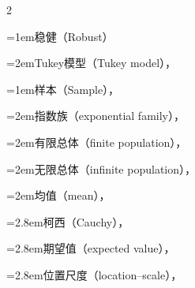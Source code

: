 \begin{multicols}{2}
\par\addvspace{2pt}
\par\noindent\hangindent=1em\hspace*{0em}\label{idx:915}稳健（Robust）\par
\par\noindent\hangindent=2em\hspace*{1em}\label{idx:916}Tukey模型（Tukey model），\hyperref[exercise:10.23]{\pageref*{exercise:10.23}}\par
\par\addvspace{2pt}
\par\noindent\hangindent=1em\hspace*{0em}\label{idx:917}样本（Sample），\hyperref[def:5.1.1]{\pageref*{def:5.1.1}}\par
\par\noindent\hangindent=2em\hspace*{1em}\label{idx:918}指数族（exponential family），\hyperref[thm:5.2.11]{\pageref*{thm:5.2.11}}\par
\par\noindent\hangindent=2em\hspace*{1em}\label{idx:919}有限总体（finite population），\hyperref[idxocc:919:201]{\pageref*{idxocc:919:201}}\par
\par\noindent\hangindent=2em\hspace*{1em}\label{idx:920}无限总体（infinite population），\hyperref[idxocc:920:201]{\pageref*{idxocc:920:201}}\par
\par\noindent\hangindent=2em\hspace*{1em}\label{idx:921}均值（mean），\hyperref[def:5.2.2]{\pageref*{def:5.2.2}}\par
\par\noindent\hangindent=2.8em\hspace*{1.8em}\label{idx:922}柯西（Cauchy），\hyperref[ex:5.2.10]{\pageref*{ex:5.2.10}}\par
\par\noindent\hangindent=2.8em\hspace*{1.8em}\label{idx:923}期望值（expected value），\hyperref[thm:5.2.6]{\pageref*{thm:5.2.6}}\par
\par\noindent\hangindent=2.8em\hspace*{1.8em}\label{idx:924}位置尺度（location–scale），\hyperref[idxocc:924:208]{\pageref*{idxocc:924:208}}\par

\end{multicols}
